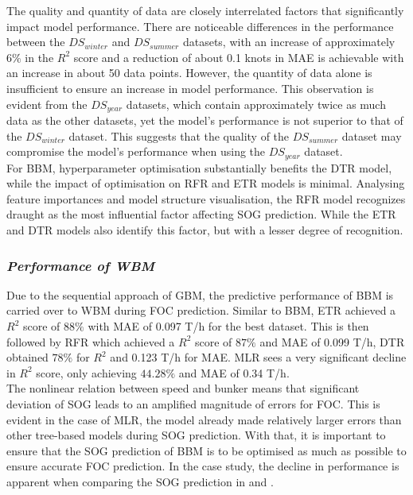 The quality and quantity of data are closely interrelated factors that significantly impact model performance. There are noticeable differences in the performance between the $DS_{winter}$ and $DS_{summer}$ datasets, with an increase of approximately $6\%$ in the $R^2$ score and a reduction of about 0.1 knots in MAE is achievable with an increase in about 50 data points. However, the quantity of data alone is insufficient to ensure an increase in model performance. This observation is evident from the $DS_{year}$ datasets, which contain approximately twice as much data as the other datasets, yet the model's performance is not superior to that of the $DS_{winter}$ dataset. This suggests that the quality of the $DS_{summer}$ dataset may compromise the model's performance when using the $DS_{year}$ dataset.\\

For BBM, hyperparameter optimisation substantially benefits the DTR model, while the impact of optimisation on RFR and ETR models is minimal. Analysing feature importances and model structure visualisation, the RFR model recognizes draught as the most influential factor affecting SOG prediction. While the ETR and DTR models also identify this factor, but with a lesser degree of recognition.\\

\subsubsection*{\emph{Performance of WBM}}


Due to the sequential approach of GBM, the predictive performance of BBM is carried over to WBM during FOC prediction. Similar to BBM, ETR achieved a $R^2$ score of $88\%$ with MAE of 0.097 T/h for the best dataset. This is then followed by RFR which achieved a $R^2$ score of $87\%$ and MAE of 0.099 T/h, DTR obtained $78\%$ for $R^2$ and 0.123 T/h for MAE. MLR sees a very significant decline in $R^2$ score, only achieving $44.28\%$ and MAE of 0.34 T/h.\\

The nonlinear relation between speed and bunker means that significant deviation of SOG leads to an amplified magnitude of errors for FOC. This is evident in the case of MLR, the model already made relatively larger errors than other tree-based models during SOG prediction. With that, it is important to ensure that the SOG prediction of BBM is to be optimised as much as possible to ensure accurate FOC prediction. In the case study, the decline in performance is apparent when comparing the SOG prediction in  and .\\

